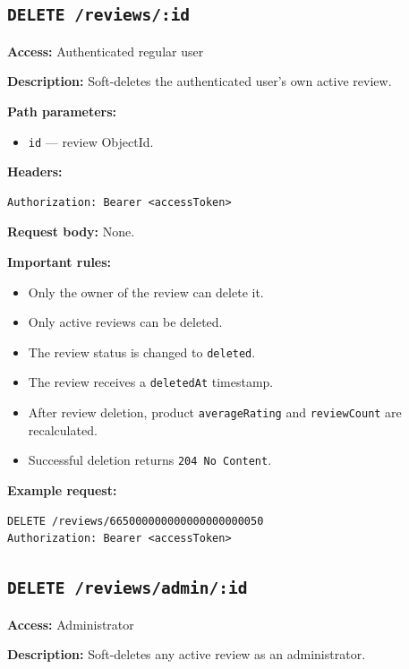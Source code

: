 \subsection{\texttt{DELETE /reviews/:id}}

\textbf{Access:} Authenticated regular user

\textbf{Description:} Soft-deletes the authenticated user's own active review.

\textbf{Path parameters:}

\begin{itemize}
    \item \texttt{id} --- review ObjectId.
\end{itemize}

\textbf{Headers:}

\begin{verbatim}
Authorization: Bearer <accessToken>
\end{verbatim}

\textbf{Request body:} None.

\textbf{Important rules:}

\begin{itemize}
    \item Only the owner of the review can delete it.
    \item Only active reviews can be deleted.
    \item The review status is changed to \texttt{deleted}.
    \item The review receives a \texttt{deletedAt} timestamp.
    \item After review deletion, product \texttt{averageRating} and \texttt{reviewCount} are recalculated.
    \item Successful deletion returns \texttt{204 No Content}.
\end{itemize}

\textbf{Example request:}

\begin{verbatim}
DELETE /reviews/665000000000000000000050
Authorization: Bearer <accessToken>
\end{verbatim}

\subsection{\texttt{DELETE /reviews/admin/:id}}

\textbf{Access:} Administrator

\textbf{Description:} Soft-deletes any active review as an administrator.

